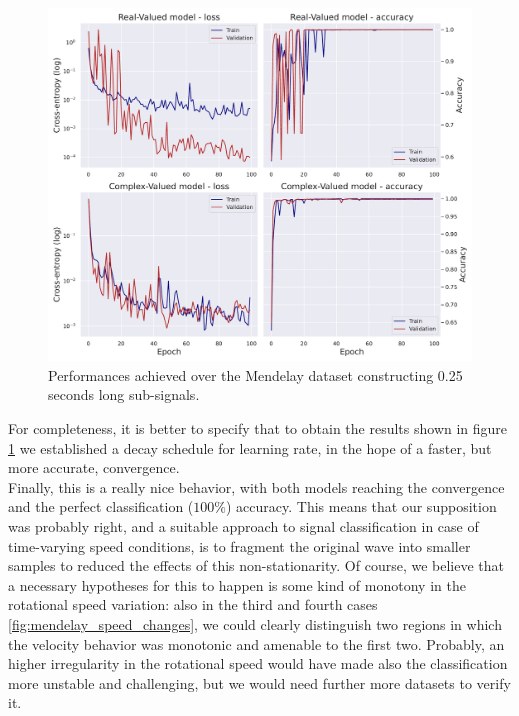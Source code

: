 \documentclass[../main.tex]{subfiles}
\begin{document}
\begin{figure}[!ht]
	\centering
	\includegraphics[width=\textwidth]{pictures/mendeley_train_final}
	\caption{Performances achieved over the Mendelay dataset constructing 0.25 seconds long sub-signals.}
	\label{fig:mendeley_train_final}
\end{figure}
For completeness, it is better to specify that to obtain the results shown in figure \ref{fig:mendeley_train_final} we established a decay schedule for learning rate, in the hope of a faster, but more accurate, convergence.\\
Finally, this is a really nice behavior, with both models reaching the convergence and the perfect classification ($100\%$) accuracy. This means that our supposition was probably right, and a suitable approach to signal classification in case of time-varying speed conditions, is to fragment the original wave into smaller samples to reduced the effects of this non-stationarity. Of course, we believe that a necessary hypotheses for this to happen is some kind of monotony in the rotational speed variation: also in the third and fourth cases \ref{fig:mendelay_speed_changes}, we could clearly distinguish two regions in which the velocity behavior was monotonic and amenable to the first two. Probably, an higher irregularity in the rotational speed would have made also the classification more unstable and challenging, but we would need further more datasets to verify it.\\
\end{document}
